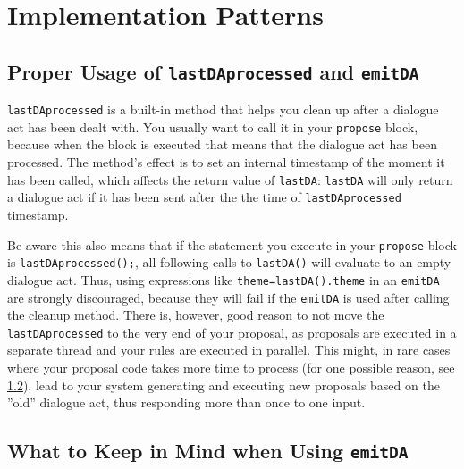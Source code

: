 \section{Implementation Patterns}

\subsection{Proper Usage of \texttt{lastDAprocessed} and \texttt{emitDA}}

\texttt{lastDAprocessed} is a built-in method that helps you clean up after a dialogue act has been dealt with. You usually want to call it in your \texttt{propose} block, because when the block is executed that means that the dialogue act has been processed. The method's effect is to set an internal timestamp of the moment it has been called, which affects the return value of \texttt{lastDA}: \texttt{lastDA} will only return a dialogue act if it has been sent after the the time of \texttt{lastDAprocessed} timestamp.

Be aware this also means that if the statement you execute in your \texttt{propose} block is \texttt{lastDAprocessed();}, all following calls to \texttt{lastDA()} will evaluate to an empty dialogue act. Thus, using expressions like \texttt{theme=lastDA().theme} in an \texttt{emitDA} are strongly discouraged, because they will fail if the \texttt{emitDA} is used after calling the cleanup method. There is, however, good reason to not move the \texttt{lastDAprocessed} to the very end of your proposal, as proposals are executed in a separate thread and your 
\vonda rules are executed in parallel. This might, in rare cases where your proposal code takes more time to process (for one possible reason, see \ref{emitDA}), lead to your system generating and executing new proposals based on the ''old'' dialogue act, thus responding more than once to one input.

\subsection{What to Keep in Mind when Using \texttt{emitDA}} \label{emitDA}
